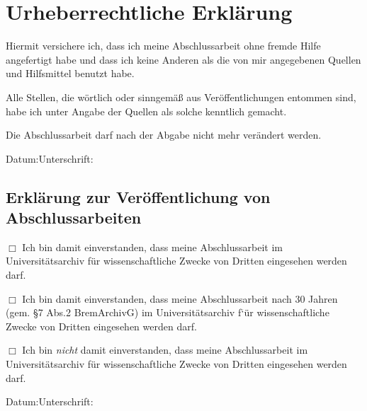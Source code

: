 \chapter*{Urheberrechtliche Erklärung}
Hiermit versichere ich, dass ich meine Abschlussarbeit ohne fremde Hilfe angefertigt habe und dass ich keine Anderen als die von mir angegebenen Quellen und Hilfsmittel benutzt habe.\par
Alle Stellen, die wörtlich oder sinngemä{\ss} aus Veröffentlichungen entommen sind, habe ich unter Angabe der Quellen als solche kenntlich gemacht.\par
Die Abschlussarbeit darf nach der Abgabe nicht mehr verändert werden.\par
\vspace{2.5em}
Datum:\underline{\hspace{3.5cm}}\qquad Unterschrift:\underline{\hspace{5.5cm}}
\vspace{3em}
\section*{Erklärung zur Veröffentlichung von Abschlussarbeiten}
$\Box$ Ich bin damit einverstanden, dass meine Abschlussarbeit im Universitätsarchiv für wissenschaftliche Zwecke von Dritten eingesehen werden darf.\par
$\Box$ Ich bin damit einverstanden, dass meine Abschlussarbeit nach 30 Jahren (gem. §7 Abs.2 BremArchivG) im Universitätsarchiv f`ür wissenschaftliche Zwecke von Dritten eingesehen werden darf.\par
$\Box$ Ich bin \textit{nicht} damit einverstanden, dass meine Abschlussarbeit im Universitätsarchiv für wissenschaftliche Zwecke von Dritten eingesehen werden darf.\par
\vspace{2.5em}
Datum:\underline{\hspace{3.5cm}}\qquad Unterschrift:\underline{\hspace{5.5cm}}
